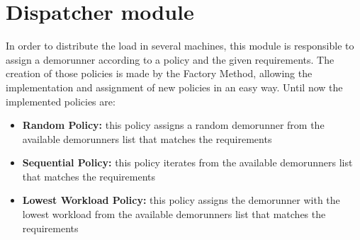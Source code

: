 \section{Dispatcher module}
\label{sec:Dispatcher}
In order to distribute the load in several machines, this module is responsible to assign a demorunner according to a policy and the given requirements. 
The creation of those policies is made by the Factory Method, allowing the implementation and assignment of new policies in an easy way.
Until now the implemented policies are:

\begin{itemize}
\item \textbf{Random Policy:} this policy assigns a random demorunner from the available demorunners list that matches the requirements 
\item \textbf{Sequential Policy:} this policy iterates from the available demorunners list that matches the requirements 
\item \textbf{Lowest Workload Policy:} this policy assigns the demorunner with the lowest workload from the available demorunners list that matches the requirements 
\end{itemize}
